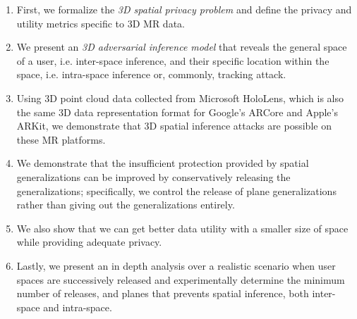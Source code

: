 \begin{enumerate}%
	\item First, we formalize the \textit{3D spatial privacy problem} and define the privacy and utility metrics specific to 3D MR data.
	\item We present an \textit{3D adversarial inference model} that reveals the general space of a user, i.e. inter-space inference, and their specific location within the space, i.e. intra-space inference or, commonly, tracking attack.%
	\item Using 3D point cloud data collected from Microsoft HoloLens, which is also the same 3D data representation format for Google's ARCore and Apple's ARKit, we demonstrate that 3D spatial inference attacks are possible on these MR platforms.
	\item We demonstrate that the insufficient protection provided by spatial generalizations can be improved by conservatively releasing the generalizations; specifically, we control the release of plane generalizations rather than giving out the generalizations entirely. %
	\item We also show that we can get better data utility with a smaller size of space while providing adequate privacy. 
	\item Lastly, we present an in depth analysis over a realistic scenario when user spaces are successively released and experimentally determine the minimum number of releases, and planes that prevents spatial inference, both inter-space and intra-space.
\end{enumerate}


